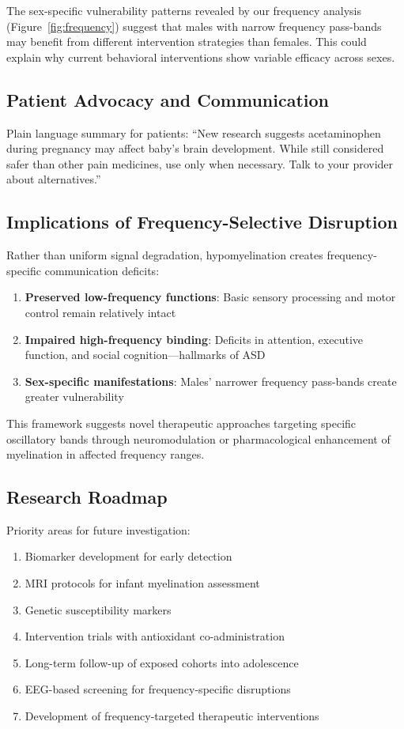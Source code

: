 \documentclass[12pt]{article}
\begin{document}
The sex-specific vulnerability patterns revealed by our frequency analysis (Figure~\ref{fig:frequency}) suggest that males with narrow frequency pass-bands may benefit from different intervention strategies than females. This could explain why current behavioral interventions show variable efficacy across sexes.

\subsection{Patient Advocacy and Communication}
Plain language summary for patients: ``New research suggests acetaminophen during pregnancy may affect baby's brain development. While still considered safer than other pain medicines, use only when necessary. Talk to your provider about alternatives.''

\subsection{Implications of Frequency-Selective Disruption}
Rather than uniform signal degradation, hypomyelination creates frequency-specific communication deficits:

\begin{enumerate}
\item \textbf{Preserved low-frequency functions}: Basic sensory processing and motor control remain relatively intact
\item \textbf{Impaired high-frequency binding}: Deficits in attention, executive function, and social cognition---hallmarks of ASD
\item \textbf{Sex-specific manifestations}: Males' narrower frequency pass-bands create greater vulnerability
\end{enumerate}

This framework suggests novel therapeutic approaches targeting specific oscillatory bands through neuromodulation or pharmacological enhancement of myelination in affected frequency ranges.

\subsection{Research Roadmap}
Priority areas for future investigation:
\begin{enumerate}
\item Biomarker development for early detection \citep{ji2020}
\item MRI protocols for infant myelination assessment \citep{baker2020}
\item Genetic susceptibility markers \citep{leppert2019,schultz2008}
\item Intervention trials with antioxidant co-administration \citep{parker2020}
\item Long-term follow-up of exposed cohorts into adolescence \citep{liew2021}
\item EEG-based screening for frequency-specific disruptions
\item Development of frequency-targeted therapeutic interventions
\end{enumerate}
\end{document}
